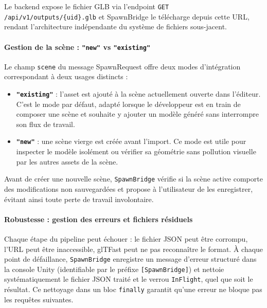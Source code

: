 \documentclass[12pt,a4paper,oneside]{report}
\begin{document}
Le backend expose le fichier GLB via l'endpoint
\texttt{GET /api/v1/outputs/\{uid\}.glb} et SpawnBridge le
télécharge depuis cette URL, rendant l'architecture indépendante
du système de fichiers sous-jacent.

\paragraph{Gestion de la scène : \texttt{"new"} vs \texttt{"existing"}}

Le champ \texttt{scene} du message SpawnRequest offre deux modes
d'intégration correspondant à deux usages distincts :

\begin{itemize}
  \item \textbf{\texttt{"existing"}} : l'asset est ajouté à la scène
    actuellement ouverte dans l'éditeur. C'est le mode par défaut,
    adapté lorsque le développeur est en train de composer une scène
    et souhaite y ajouter un modèle généré sans interrompre son flux
    de travail.
  \item \textbf{\texttt{"new"}} : une scène vierge est créée avant
    l'import. Ce mode est utile pour inspecter le modèle isolément
    ou vérifier sa géométrie sans pollution visuelle par les autres
    assets de la scène.
\end{itemize}

Avant de créer une nouvelle scène, \texttt{SpawnBridge} vérifie si
la scène active comporte des modifications non sauvegardées et
propose à l'utilisateur de les enregistrer, évitant ainsi toute
perte de travail involontaire.

\paragraph{Robustesse : gestion des erreurs et fichiers résiduels}

Chaque étape du pipeline peut échouer : le fichier JSON peut être
corrompu, l'URL peut être inaccessible, glTFast peut ne pas
reconnaître le format. À chaque point de défaillance, \texttt{SpawnBridge}
enregistre un message d'erreur structuré dans la console Unity
(identifiable par le préfixe \texttt{[SpawnBridge]}) et nettoie
systématiquement le fichier JSON traité et le verrou \texttt{InFlight},
quel que soit le résultat. Ce nettoyage dans un bloc \texttt{finally}
garantit qu'une erreur ne bloque pas les requêtes suivantes.
\end{document}
